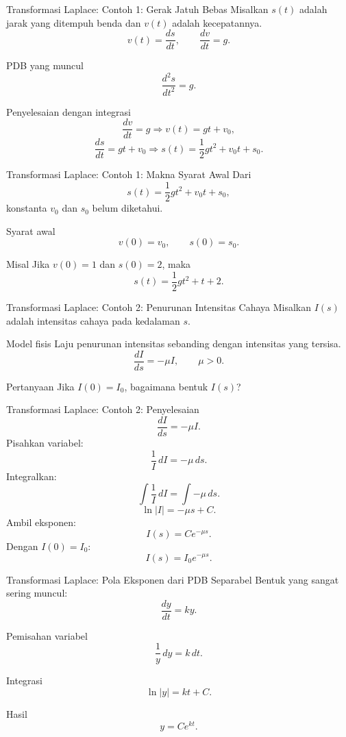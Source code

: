 \documentclass[aspectratio=169,11pt]{beamer}
\begin{document}
\begin{frame}{Transformasi Laplace: Contoh 1: Gerak Jatuh Bebas}
Misalkan $s(t)$ adalah jarak yang ditempuh benda dan $v(t)$ adalah kecepatannya.
\[
v(t)=\frac{ds}{dt},\qquad \frac{dv}{dt}=g.
\]
\begin{block}{PDB yang muncul}
\[
\frac{d^2s}{dt^2}=g.
\]
\end{block}
\begin{exampleblock}{Penyelesaian dengan integrasi}
\[
\frac{dv}{dt}=g \Rightarrow v(t)=gt+v_0,
\]
\[
\frac{ds}{dt}=gt+v_0 \Rightarrow s(t)=\frac{1}{2}gt^2+v_0t+s_0.
\]
\end{exampleblock}
\end{frame}

\begin{frame}{Transformasi Laplace: Contoh 1: Makna Syarat Awal}
Dari
\[
s(t)=\frac{1}{2}gt^2+v_0t+s_0,
\]
konstanta $v_0$ dan $s_0$ belum diketahui.
\begin{block}{Syarat awal}
\[
v(0)=v_0,\qquad s(0)=s_0.
\]
\end{block}
\begin{exampleblock}{Misal}
Jika $v(0)=1$ dan $s(0)=2$, maka
\[
s(t)=\frac{1}{2}gt^2+t+2.
\]
\end{exampleblock}
\end{frame}

\begin{frame}{Transformasi Laplace: Contoh 2: Penurunan Intensitas Cahaya}
Misalkan $I(s)$ adalah intensitas cahaya pada kedalaman $s$.
\begin{block}{Model fisis}
Laju penurunan intensitas sebanding dengan intensitas yang tersisa.
\[
\frac{dI}{ds}=-\mu I,\qquad \mu>0.
\]
\end{block}
\begin{exampleblock}{Pertanyaan}
Jika $I(0)=I_0$, bagaimana bentuk $I(s)$?
\end{exampleblock}
\end{frame}

\begin{frame}{Transformasi Laplace: Contoh 2: Penyelesaian}
\[
\frac{dI}{ds}=-\mu I.
\]
Pisahkan variabel:
\[
\frac{1}{I}\,dI=-\mu\,ds.
\]
Integralkan:
\[
\int \frac{1}{I}\,dI=\int -\mu\,ds.
\]
\[
\ln|I|=-\mu s+C.
\]
Ambil eksponen:
\[
I(s)=Ce^{-\mu s}.
\]
Dengan $I(0)=I_0$:
\[
\boxed{I(s)=I_0e^{-\mu s}.}
\]
\end{frame}

\begin{frame}{Transformasi Laplace: Pola Eksponen dari PDB Separabel}
Bentuk yang sangat sering muncul:
\[
\frac{dy}{dt}=ky.
\]
\begin{block}{Pemisahan variabel}
\[
\frac{1}{y}\,dy=k\,dt.
\]
\end{block}
\begin{block}{Integrasi}
\[
\ln|y|=kt+C.
\]
\end{block}
\begin{block}{Hasil}
\[
y=Ce^{kt}.
\]
\end{block}
\end{frame}
\end{document}
